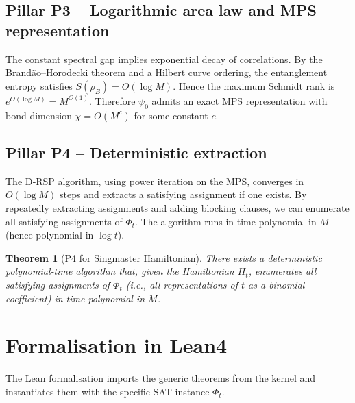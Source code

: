 \documentclass[11pt,a4paper]{article}
\newtheorem{theorem}{Theorem}[section]
\begin{document}
\subsection{Pillar P3 – Logarithmic area law and MPS representation}
The constant spectral gap implies exponential decay of correlations. By the Brandão–Horodecki theorem and a Hilbert curve ordering, the entanglement entropy satisfies \(S(\rho_B) = O(\log M)\). Hence the maximum Schmidt rank is \(e^{O(\log M)} = M^{O(1)}\). Therefore \(\psi_0\) admits an exact MPS representation with bond dimension \(\chi = O(M^c)\) for some constant \(c\).

\subsection{Pillar P4 – Deterministic extraction}
The D‑RSP algorithm, using power iteration on the MPS, converges in \(O(\log M)\) steps and extracts a satisfying assignment if one exists. By repeatedly extracting assignments and adding blocking clauses, we can enumerate all satisfying assignments of \(\Phi_t\). The algorithm runs in time polynomial in \(M\) (hence polynomial in \(\log t\)).

\begin{theorem}[P4 for Singmaster Hamiltonian]
There exists a deterministic polynomial‑time algorithm that, given the Hamiltonian \(H_t\), enumerates all satisfying assignments of \(\Phi_t\) (i.e., all representations of \(t\) as a binomial coefficient) in time polynomial in \(M\).
\end{theorem}

\section{Formalisation in Lean4}

The Lean formalisation imports the generic theorems from the kernel and instantiates them with the specific SAT instance \(\Phi_t\).
\end{document}

